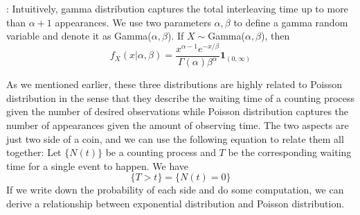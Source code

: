 \documentclass[../Distributions.tex]{subfiles}
\begin{document}
: Intuitively, gamma distribution captures the total interleaving time up to more than $\alpha+1$ appearances. We use two parameters $\alpha,\beta$ to define a gamma random variable and denote it as Gamma($\alpha,\beta$). If $X\sim$Gamma($\alpha,\beta$), then
$$f_X(x|\alpha,\beta) = \frac{x^{\alpha-1}e^{-x/\beta}}{\Gamma(\alpha)\beta^{\alpha}}\mathbf{1}_{(0,\infty)}$$

As we mentioned earlier, these three distributions are highly related to Poisson distribution in the sense that they describe the waiting time of a counting process given the number of desired observations while Poisson distribution captures the number of appearances given the amount of observing time. The two aspects are just two side of a coin, and we can use the following equation to relate them all together: Let $\{N(t)\}$ be a counting process and $T$ be the corresponding waiting time for a single event to happen. We have 
$$\{T>t\} = \{N(t)=0\}$$
If we write down the probability of each side and do some computation, we can derive a relationship between exponential distribution and Poisson distribution.
\end{document}
